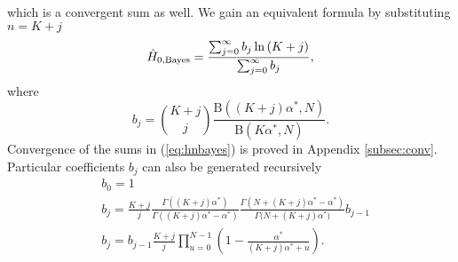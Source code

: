 which is a convergent sum as well. We gain an equivalent formula by substituting $n=K+j$ \begin{equation} 
\label{eq:hnbayesb}
\hat{H}_{0,\mbox{\scriptsize{Bayes}}} = \frac{\sum_{j=0}^{\infty}{b_{j}\ln{(K+j)}}}{\sum_{j=0}^{\infty}{b_j}},
\end{equation}
where
\begin{equation}
b_{j}= \binom{K+j}{j} \frac{\mathrm{B}\left( (K+j)\alpha^{*}, N \right)}{\mathrm{B}\left( K\alpha^{*}, N \right)}.
\end{equation} 
Convergence of the sums in (\ref{eq:hnbayes}) is proved in Appendix \ref{subsec:conv}. Particular coefficients $b_{j}$ can also be generated recursively
\begin{equation}
\label{eq:breform}
\begin{split}
& b_{0} = 1 \\
& b_{j} = \frac{K+j}{j} \frac{\Gamma{((K+j)\alpha^{*})}}{\Gamma{((K+j)\alpha^{*}-\alpha^{*})}}\frac{\Gamma{(N+(K+j)\alpha^{*} -\alpha^{*})}}{\Gamma({N+(K+j)\alpha^{*})}} b_{j-1} \\
& b_{j} = b_{j-1} \frac{K+j}{j}\prod_{u=0}^{N-1} \left(1 - \frac{\alpha^{*}}{(K+j)\alpha^{*}+u} \right).
\end{split}
\end{equation}
